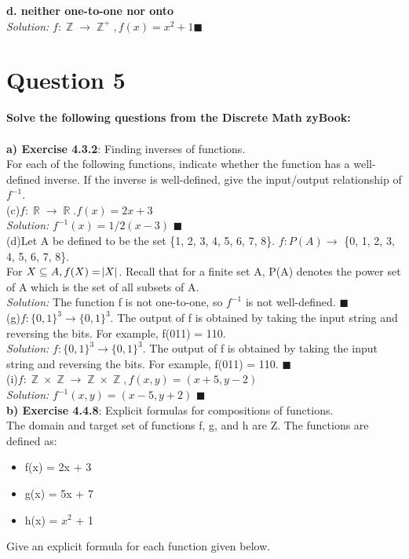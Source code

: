 \documentclass[11pt]{article}
\DeclareMathOperator*{\R}{\mathbb{R}}\relax
\DeclareMathOperator*{\Z}{\mathbb{Z}}\relax
\begin{document}
		\textbf{d. neither one-to-one nor onto} \\
		\textit{Solution: }
		$f: \Z \rightarrow \Z^+, f(x) = x^2 + 1 \blacksquare$
	
	\newpage
	\section*{Question 5}
	\textbf{Solve the following questions from the Discrete Math zyBook:}\\
	\\
		\textbf{a) Exercise 4.3.2}: Finding inverses of functions.\\	
		For each of the following functions, indicate whether the function has a well-defined inverse. 
		If the inverse is well-defined, give the input/output relationship of $f^{-1}$.\\
		
		(c)$f: \R \rightarrow \R. f(x) = 2x + 3$ \\
		\textit{Solution: }
		$f^{-1} (x)= {1/2}(x-3)$ $\blacksquare$\\
		
		(d)Let A be defined to be the set \{1, 2, 3, 4, 5, 6, 7, 8\}. $f: P(A) \rightarrow$ \{0, 1, 2, 3, 4, 5, 6, 7, 8\}. \\
		For $X \subseteq A, f(X) = \abs{X}$. Recall that for a finite set A, P(A) denotes the power set of A which is the set of all subsets of A. \\
		\textit{Solution: }
		The function f is not one-to-one, so $f^{-1}$ is not well-defined. $\blacksquare$\\
		
		(g)$f: \{0, 1\}^3\rightarrow\{0, 1\}^3$. The output of f is obtained by taking the input string and reversing the bits. For example, f(011) = 110. \\
		\textit{Solution: }
		$f: \{0, 1\}^3\rightarrow\{0, 1\}^3$. The output of f is obtained by taking the input string and reversing the bits. For example, f(011) = 110. $\blacksquare$ \\

		(i)$f: \Z \times \Z \rightarrow \Z \times \Z, f(x, y) = (x+5, y-2)$ \\
		\textit{Solution: }
		$f^{-1}(x, y) = (x-5, y+2)$ $\blacksquare$ \\
		
		\textbf{b) Exercise 4.4.8}: Explicit formulas for compositions of functions.\\	
		The domain and target set of functions f, g, and h are Z. The functions are defined as:
		\begin{itemize}
			\item f(x) = 2x + 3
			\item g(x) = 5x + 7
			\item h(x) = $x^2$ + 1
		\end{itemize}
		Give an explicit formula for each function given below.
		
\end{document}
